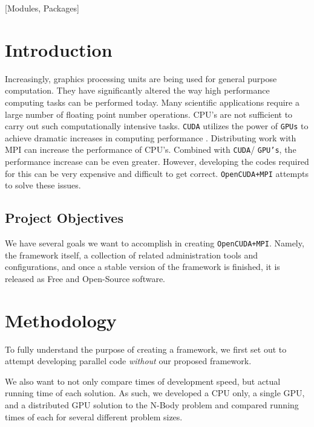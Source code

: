 \documentclass{acm_proc_article-sp}
\begin{document}
[Modules, Packages]



\section{Introduction}

Increasingly, graphics processing units are being used for general purpose
computation. They have significantly altered the way high performance
computing tasks can be performed today. Many scientific applications require a
large number of floating point number operations. CPU's are not sufficient to
carry out such computationally intensive tasks.  \texttt{CUDA} utilizes the
power of \texttt{GPUs} to achieve dramatic increases in computing performance
\cite{website:cudaCProgrammingGuide}. Distributing work with MPI can increase
the performance of CPU's. Combined with \texttt{CUDA}/ \texttt{GPU's}, the
performance increase can be even greater.  However, developing the codes
required for this can be very expensive and difficult to get correct.
\texttt{OpenCUDA+MPI} attempts to solve these issues.

\subsection{Project Objectives}

We have several goals we want to accomplish in creating \texttt{OpenCUDA+MPI}.
Namely, the framework itself, a collection of related administration tools and
configurations, and once a stable version of the framework is finished, it is
released as Free and Open-Source software.

\section{Methodology}

To fully understand the purpose of creating a framework, we first set out to
attempt developing parallel code \emph{without} our proposed framework.

We also want to not only compare times of development speed, but actual running
time of each solution. As such, we developed a CPU only, a single GPU, and a
distributed GPU solution to the N-Body problem and compared running times of
each for several different problem sizes.
\end{document}
